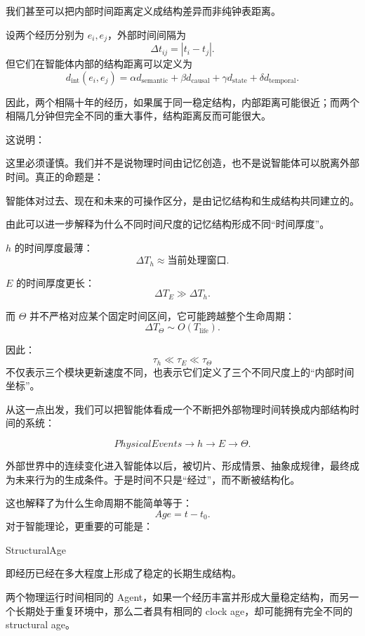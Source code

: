我们甚至可以把内部时间距离定义成结构差异而非纯钟表距离。

设两个经历分别为 \(e_i,e_j\)，外部时间间隔为
\[
\Delta t_{ij}=|t_i-t_j|.
\]
但它们在智能体内部的结构距离可以定义为
\[
d_{\mathrm{int}}(e_i,e_j)
=
\alpha d_{\mathrm{semantic}}
+
\beta d_{\mathrm{causal}}
+
\gamma d_{\mathrm{state}}
+
\delta d_{\mathrm{temporal}}.
\]

因此，两个相隔十年的经历，如果属于同一稳定结构，内部距离可能很近；而两个相隔几分钟但完全不同的重大事件，结构距离反而可能很大。

这说明：
\begin{statementbox}
\centering
{}
\end{statementbox}

这里必须谨慎。我们并不是说物理时间由记忆创造，也不是说智能体可以脱离外部时间。真正的命题是：

\begin{proposition*}
智能体对过去、现在和未来的可操作区分，是由记忆结构和生成结构共同建立的。
\end{proposition*}

由此可以进一步解释为什么不同时间尺度的记忆结构形成不同“时间厚度”。

\(h\) 的时间厚度最薄：
\[
\Delta T_h\approx\text{当前处理窗口}.
\]

\(E\) 的时间厚度更长：
\[
\Delta T_E
\gg
\Delta T_h.
\]

而 \(\Theta\) 并不严格对应某个固定时间区间，它可能跨越整个生命周期：
\[
\Delta T_\Theta
\sim
O(T_{\mathrm{life}}).
\]

因此：
\[
\boxed{
\tau_h
\ll
\tau_E
\ll
\tau_\Theta
}
\]
不仅表示三个模块更新速度不同，也表示它们定义了三个不同尺度上的“内部时间坐标”。

从这一点出发，我们可以把智能体看成一个不断把外部物理时间转换成内部结构时间的系统：

\[
PhysicalEvents
\rightarrow
h
\rightarrow
E
\rightarrow
\Theta.
\]

外部世界中的连续变化进入智能体以后，被切片、形成情景、抽象成规律，最终成为未来行为的生成条件。于是时间不只是“经过”，而不断被结构化。

这也解释了为什么生命周期不能简单等于：
\[
Age=t-t_0.
\]
对于智能理论，更重要的可能是：
\begin{statementbox}
StructuralAge
\end{statementbox}
即经历已经在多大程度上形成了稳定的长期生成结构。

两个物理运行时间相同的 Agent，如果一个经历丰富并形成大量稳定结构，而另一个长期处于重复环境中，那么二者具有相同的 clock age，却可能拥有完全不同的 structural age。

